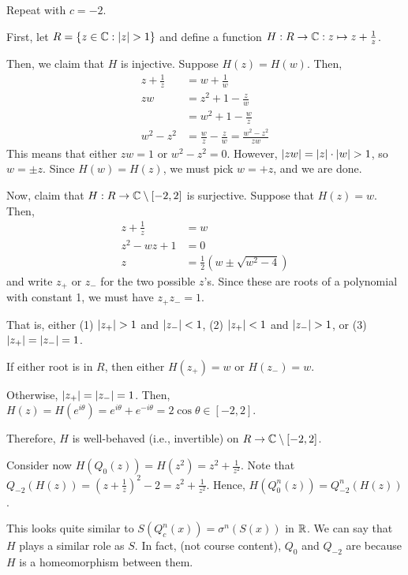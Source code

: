 \documentclass[class=pmath370,tikz,notes]{agony}
\begin{document}
\begin{example}
  Repeat with $c = -2$.
\end{example}
\begin{sol}
  First, let $R = \{z \in \mathbb{C} : \abs{z} > 1\}$
  and define a function $H : R \to \mathbb{C} : z \mapsto z + \frac{1}{z}$.

  Then, we claim that $H$ is injective. Suppose $H(z) = H(w)$. Then,
  \begin{align*}
    z + \frac1z & = w + \frac1w                                    \\
    zw          & = z^2 + 1 - \frac{z}{w}                          \\
                & = w^2 + 1 - \frac{w}{z}                          \\
    w^2 - z^2   & = \frac{w}{z} - \frac{z}{w} = \frac{w^2-z^2}{zw}
  \end{align*}
  This means that either $zw = 1$ or $w^2 - z^2 = 0$.
  However, $\abs{zw} = \abs{z}\cdot\abs{w} > 1$, so $w = \pm z$.
  Since $H(w) = H(z)$, we must pick $w = +z$, and we are done.

  Now, claim that $H : R \to \mathbb{C} \setminus [-2,2]$ is surjective.
  Suppose that $H(z) = w$. Then,
  \begin{align*}
    z + \frac1z  & = w                             \\
    z^2 - wz + 1 & = 0                             \\
    z            & = \frac12(w \pm \sqrt{w^2 - 4})
  \end{align*}
  and write $z_+$ or $z_-$ for the two possible $z$'s.
  Since these are roots of a polynomial with constant 1,
  we must have $z_+z_- = 1$.

  That is, either (1) $\abs{z_+} > 1$ and $\abs{z_-} < 1$,
  (2) $\abs{z_+} < 1$ and $\abs{z_-} > 1$,
  or (3) $\abs{z_+} = \abs{z_-} = 1$.

  If either root is in $R$, then either $H(z_+) = w$ or $H(z_-) = w$.

  Otherwise, $\abs{z_+} = \abs{z_-} = 1$.
  Then, $H(z) = H(e^{i\theta}) = e^{i\theta} + e^{-i\theta} = 2\cos\theta \in [-2,2]$.

  Therefore, $H$ is well-behaved (i.e., invertible) on $R \to \mathbb{C} \setminus [-2,2]$.

  Consider now $H(Q_0(z)) = H(z^2) = z^2 + \frac{1}{z^2}$.
  Note that $Q_{-2}(H(z)) = (z+\frac{1}{z})^2 - 2 = z^2+\frac{1}{z^2}$.
  Hence, $H(Q_0^n(z)) = Q_{-2}^n(H(z))$.

  This looks quite similar to $S(Q_c^n(x)) = \sigma^n(S(x))$ in $\mathbb{R}$.
  We can say that $H$ plays a similar role as $S$.
  In fact, (not course content), $Q_0$ and $Q_{-2}$ are 
  because $H$ is a homeomorphism between them.


\end{sol}
\end{document}
